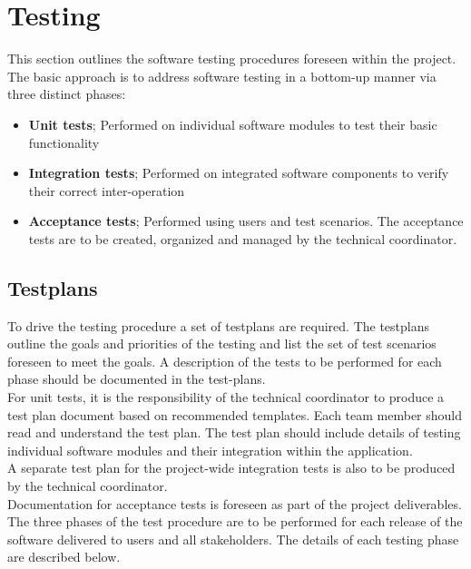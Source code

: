 \section{Testing}

This section outlines the software testing procedures foreseen within the project. The basic approach is to address software testing in a bottom-up manner via three distinct phases:
\begin{itemize}
\item \textbf{Unit tests};\newline
Performed on individual software modules to test their basic functionality 
\item \textbf{Integration tests};\newline
Performed on integrated software components to verify their correct inter-operation
\item \textbf{Acceptance tests};\newline
Performed using users and test scenarios. The acceptance tests are to be created, organized and managed by the technical coordinator.
\end{itemize}

\subsection{Testplans}

\noindent To drive the testing procedure a set of testplans are required. The testplans outline the goals and priorities of the testing and list the set of test scenarios foreseen to meet the goals. A description of the tests to be performed for each phase should be documented in the test-plans.\\

\noindent For unit tests, it is the responsibility of the technical coordinator to produce a test plan document based on recommended templates. Each team member should read and understand the test plan. The test plan should include details of testing individual software modules and their integration within the application.\\

\noindent A separate test plan for the project-wide integration tests is also to be produced by the technical coordinator.\\

\noindent Documentation for acceptance tests is foreseen as part of the project deliverables. 
The three phases of the test procedure are to be performed for each release of the software delivered to users and all stakeholders. The details of each testing phase are described below.

